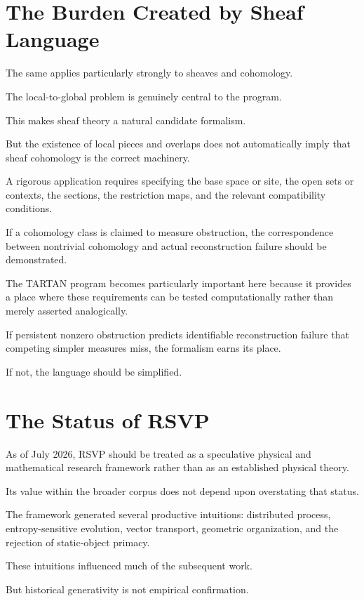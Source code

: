 \documentclass[11pt]{article}
\theoremstyle{remark}
\newcommand{\RSVP}{\textsc{RSVP}}
\newcommand{\TARTAN}{\textsc{TARTAN}}
\begin{document}
\section{The Burden Created by Sheaf Language}

The same applies particularly strongly to sheaves and cohomology.

The local-to-global problem is genuinely central to the program.

This makes sheaf theory a natural candidate formalism.

But the existence of local pieces and overlaps does not automatically imply that
sheaf cohomology is the correct machinery.

A rigorous application requires specifying the base space or site, the open
sets or contexts, the sections, the restriction maps, and the relevant
compatibility conditions.

If a cohomology class is claimed to measure obstruction, the correspondence
between nontrivial cohomology and actual reconstruction failure should be
demonstrated.

The \TARTAN{} program becomes particularly important here because it provides a
place where these requirements can be tested computationally rather than merely
asserted analogically.

If persistent nonzero obstruction predicts identifiable reconstruction failure
that competing simpler measures miss, the formalism earns its place.

If not, the language should be simplified.

\section{The Status of RSVP}

As of July 2026, \RSVP{} should be treated as a speculative physical and
mathematical research framework rather than as an established physical theory.

Its value within the broader corpus does not depend upon overstating that
status.

The framework generated several productive intuitions: distributed process,
entropy-sensitive evolution, vector transport, geometric organization, and the
rejection of static-object primacy.

These intuitions influenced much of the subsequent work.

But historical generativity is not empirical confirmation.
\end{document}
